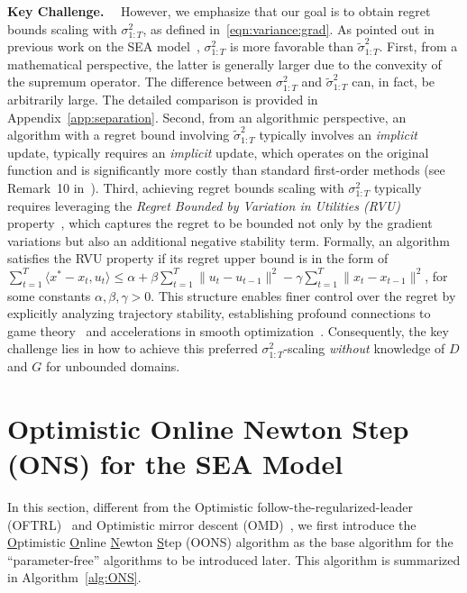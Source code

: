 \documentclass{article}
\theoremstyle{plain}
\theoremstyle{definition}
\theoremstyle{remark}
\renewcommand{\tilde}{\widetilde}
\begin{document}
\textbf{Key Challenge.}~~ However, we emphasize that our goal is to obtain regret bounds scaling with $\sigma^2_{1:T}$, as defined in~\eqref{eqn:variance:grad}. As pointed out in previous work on the SEA model~\citep[Remark~9]{chen2024optimistic}, $\sigma^2_{1:T}$ is more favorable than $\tilde{\sigma}^2_{1:T}$. First, from a mathematical perspective, the latter is generally larger due to the convexity of the supremum operator. The difference between $\sigma^2_{1:T}$ and $\tilde{\sigma}^2_{1:T}$ can, in fact, be arbitrarily large. The detailed comparison is provided in Appendix~\ref{app:separation}. Second, from an algorithmic perspective, an algorithm with a regret bound involving $\tilde{\sigma}^2_{1:T}$ typically involves an \emph{implicit} update, typically requires an \emph{implicit} update, which operates on the original function and is significantly more costly than standard first-order methods (see Remark~10 in~\cite{chen2024optimistic}). Third, achieving regret bounds scaling with $\sigma^2_{1:T}$ typically requires leveraging the \emph{Regret Bounded by Variation in Utilities (RVU)} property~\cite{syrgkanis2015fast}, which captures the regret to be bounded not only by the gradient variations but also an additional negative stability term. Formally, an algorithm satisfies the RVU property if its regret upper bound is in the form of $\sum_{t=1}^T \langle x^* - x_t, u_t \rangle \leq \alpha + \beta \sum_{t=1}^T \|u_t - u_{t-1}\|^2 - \gamma \sum_{t=1}^T \|x_t - x_{t-1}\|^2$, for some constants \(\alpha, \beta, \gamma > 0\). This structure enables finer control over the regret by explicitly analyzing trajectory stability, establishing profound connections to game theory~\cite{syrgkanis2015fast,zhang2022no} and accelerations in smooth optimization~\cite{LectureNote:AOpt25}. Consequently, the key challenge lies in how to achieve this preferred $\sigma^2_{1:T}$-scaling \emph{without} knowledge of $D$ and $G$ for unbounded domains.




\section{Optimistic Online Newton Step (ONS) for the SEA Model}\label{sec:ons}
In this section, different from the Optimistic follow-the-regularized-leader (OFTRL)~\citep{sachs2023accelerated} and Optimistic mirror descent (OMD)~\citep{chen2024optimistic}, we first introduce the \underline{O}ptimistic \underline{O}nline \underline{N}ewton \underline{S}tep (OONS) algorithm as the base algorithm for the   ``parameter-free'' algorithms to be introduced later. This algorithm is summarized in Algorithm~\ref{alg:ONS}.
\end{document}
